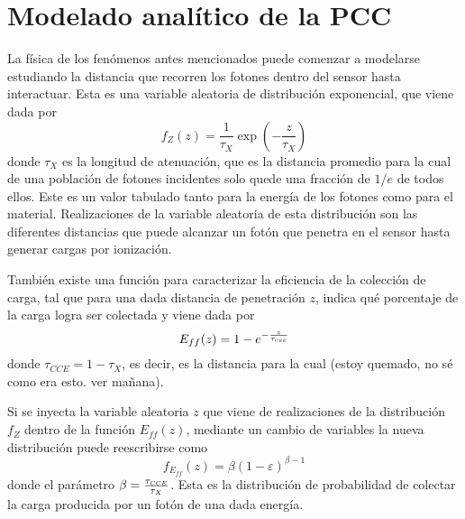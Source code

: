 \chapter{Modelado analítico de la PCC \label{chap:ModeloPCC}}
\noindent La física de los fenómenos antes mencionados puede comenzar a modelarse estudiando la distancia que recorren los fotones dentro del sensor hasta interactuar. Esta es una variable aleatoria de distribución exponencial, que viene dada por
\begin{equation*}
    f_{Z}(z) = \frac{1}{\tau_{X}}\exp(-\frac{z}{\tau_{X}})
\end{equation*}
donde $\tau_{X}$ es la longitud de atenuación, que es la distancia promedio para la cual de una población de fotones incidentes solo quede una fracción de $1/e$ de todos ellos. Este es un valor tabulado tanto para la energía de los fotones como para el material. Realizaciones de la variable aleatoria de esta distribución son las diferentes distancias que puede alcanzar un fotón que penetra en el sensor hasta generar cargas por ionización.

También existe una función para caracterizar la eficiencia de la colección de carga, tal que para una dada distancia de penetración $z$, indica qué porcentaje de la carga logra ser colectada y viene dada por
\begin{equation*}
    E_{ff}(z) = 1 - e^{-\frac{z}{\tau_{\scaleto{CEE}{2pt}}}}
\end{equation*}
donde $\tau_{CCE} = 1 - \tau_{X}$, es decir, es la distancia para la cual (estoy quemado, no sé como era esto. ver mañana). 

Si se inyecta la variable aleatoria $z$ que viene de realizaciones de la distribución $f_{Z}$ dentro de la función $E_{ff}(z)$, mediante un cambio de variables la nueva distribución puede reescribirse como
\begin{equation*}
    f_{E_{ff}}(z) = \beta (1 - \varepsilon)^{\beta - 1}
\end{equation*}
donde el parámetro $\beta = \frac{\tau_{\scaleto{CCE}{3pt}}}{\tau_{X}}$. Esta es la distribución de probabilidad de colectar la carga producida por un fotón de una dada energía.


